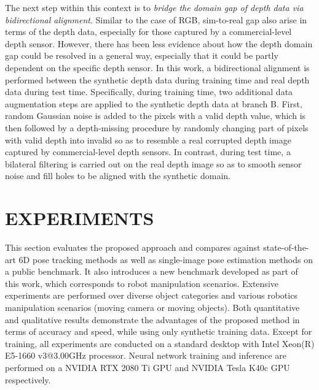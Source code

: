 \documentclass[letterpaper, 10 pt, conference]{ieeeconf}
\begin{document}
The next step within this context is to {\it bridge the domain gap of depth data via bidirectional alignment}. Similar to the case of RGB, sim-to-real gap also arise in terms of the depth data, especially for those captured by a commercial-level depth sensor. However, there has been less evidence about how the depth domain gap could be resolved in a general way, especially that it could be partly dependent on the specific depth sensor. In this work, a bidirectional alignment is performed between the synthetic depth data during training time and real depth data during test time. Specifically, during training time, two additional data augmentation steps are applied to the synthetic depth data  at branch B. First, random Gaussian noise is added to the pixels with a valid depth value, which is then followed by a depth-missing procedure by randomly changing part of pixels with valid depth into invalid so as to resemble a real corrupted depth image captured by commercial-level depth sensors. In contrast, during test time, a bilateral filtering is carried out on the real depth image so as to smooth sensor noise and fill holes to be aligned with the synthetic domain. 

\section{EXPERIMENTS}
This  section  evaluates  the  proposed  approach  and  compares  against  state-of-the-art 6D pose tracking methods as well as single-image pose estimation methods on a public benchmark. It also introduces a new benchmark developed as part of this work, which corresponds to robot manipulation scenarios. Extensive experiments are performed over diverse object categories and various robotics manipulation scenarios (moving camera or moving objects). Both quantitative and qualitative results demonstrate the advantages of the proposed method in terms of accuracy and speed, while using only synthetic training data. Except for training, all  experiments  are  conducted  on  a  standard  desktop with  Intel  Xeon(R) E5-1660 v3@3.00GHz  processor. Neural network training and inference are performed on a  NVIDIA RTX 2080 Ti GPU and  NVIDIA Tesla K40c GPU respectively.
\end{document}
